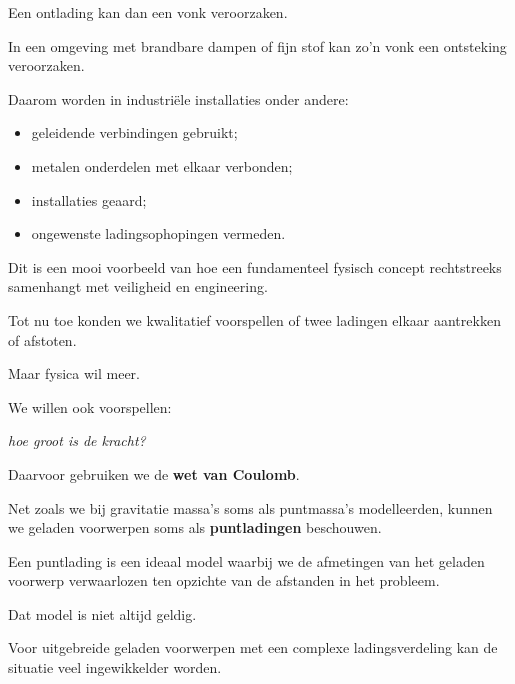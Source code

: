\documentclass{ximera}
\begin{document}
Een ontlading kan dan een vonk veroorzaken.

In een omgeving met brandbare dampen of fijn stof kan zo'n vonk een
ontsteking veroorzaken.

Daarom worden in industriële installaties onder andere:

\begin{itemize}
  \item geleidende verbindingen gebruikt;
  \item metalen onderdelen met elkaar verbonden;
  \item installaties geaard;
  \item ongewenste ladingsophopingen vermeden.
\end{itemize}


Dit is een mooi voorbeeld van hoe een fundamenteel fysisch concept
rechtstreeks samenhangt met veiligheid en engineering.




Tot nu toe konden we kwalitatief voorspellen of twee ladingen elkaar
aantrekken of afstoten.

Maar fysica wil meer.

We willen ook voorspellen:

\begin{center}
\textit{hoe groot is de kracht?}
\end{center}

Daarvoor gebruiken we de \textbf{wet van Coulomb}.




Net zoals we bij gravitatie massa's soms als puntmassa's modelleerden,
kunnen we geladen voorwerpen soms als \textbf{puntladingen}
beschouwen.

Een puntlading is een ideaal model waarbij we de afmetingen van het
geladen voorwerp verwaarlozen ten opzichte van de afstanden in het
probleem.

Dat model is niet altijd geldig.

Voor uitgebreide geladen voorwerpen met een complexe ladingsverdeling
kan de situatie veel ingewikkelder worden.
\end{document}
